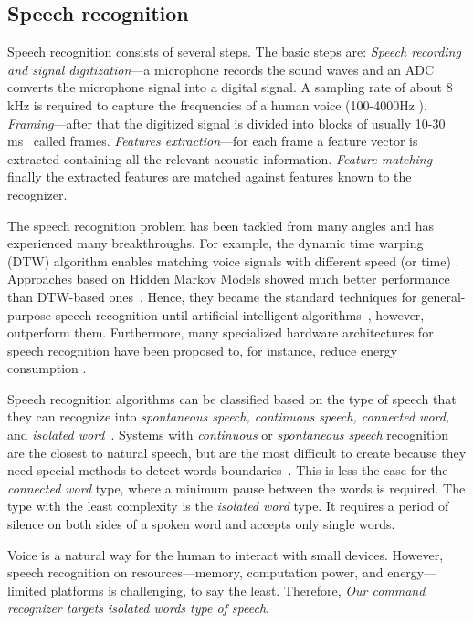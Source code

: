 \subsection{Speech recognition}
 Speech recognition consists of several steps. The basic steps are:
\textit{Speech recording and signal digitization}---a microphone records the sound waves and an ADC converts the microphone signal into a digital signal. A sampling rate of about 8 kHz is required to capture the frequencies of a human voice (100-4000Hz \cite{Bernal-Ruiz2005MicrocontrollerSystems}). \textit{Framing}---after that the digitized signal is divided into blocks of usually 10-30 ms~\cite{gaikwad2010review,delaney2002low,delaney2005energy} called frames. \textit{Features extraction}---for each frame a feature vector is extracted containing all the relevant acoustic information. \textit{Feature matching}---finally the extracted features are matched against features known to the recognizer. 

The speech recognition problem has been tackled from many angles and has experienced many breakthroughs. For example, the dynamic time warping (DTW) algorithm enables matching voice signals with different speed (or time) \cite{vintsyuk1972}. 
Approaches based on Hidden Markov Models showed much better performance than DTW-based ones~\cite{jelinek1997statistical}. Hence, they became the standard techniques for general-purpose speech recognition until artificial intelligent algorithms~\cite{hinton2012deep}, however, outperform them. Furthermore, many specialized hardware architectures for speech recognition have been proposed to, for instance, reduce energy consumption \cite{price2018low,price20156}. 

Speech recognition algorithms can be classified based on the type of speech that they can recognize into \textit{spontaneous speech, continuous speech, connected word,} and \textit{isolated word}~\cite{gaikwad2010review}.
Systems with \textit{continuous} or \textit{spontaneous speech} recognition are the closest to natural speech, but are the most difficult to create because they need special methods to detect words boundaries~\cite{gaikwad2010review}. This is less the case for the \textit{connected word} type, where a minimum pause between the words is required.
 The type with the least complexity is the \textit{isolated word} type. It requires a period of silence on both sides of a spoken word and accepts only single words. 
 
Voice is a natural way for the human to interact with small devices. However, speech recognition on resources---memory, computation power, and energy---limited platforms is challenging, to say the least. 
Therefore, \emph{Our command recognizer targets isolated words type of speech}. 



















